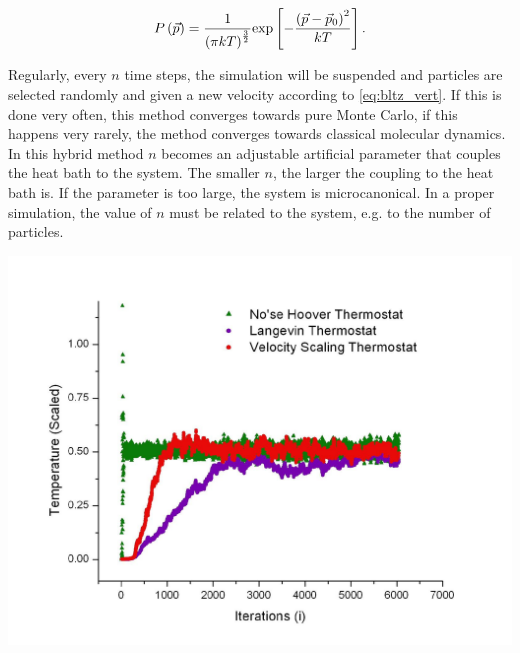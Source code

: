 \begin{equation}
P\left(\vec{p}\right) = \frac{1}{\left(\pi k T\right)^\frac{3}{2}} \text{exp}\left[ - \frac{\left(\vec{p}-\vec{p}_0\right)^2}{kT}  \right].
\label{eq:bltz_vert}
\end{equation}

Regularly, every $n$ time steps, the simulation will be suspended and particles are selected randomly and given a new velocity according to \eqref{eq:bltz_vert}. If this is done very often, this method converges towards pure Monte Carlo, if this happens very rarely, the method converges towards classical molecular dynamics. In this hybrid method $n$ becomes an adjustable artificial parameter  that couples the heat bath to the system. The smaller $n$, the larger the coupling to the heat bath is. If the parameter is too large, the system is microcanonical. In a proper simulation, the value of $n$ must be related to the system, e.g. to the number of particles.


\vspace{0.1cm}
\noindent
\begin{minipage}{\textwidth}
\begin{minipage}{.001\textwidth}
 \end{minipage}\hfill
\begin{minipage}{.99\textwidth}
  \centering
  \includegraphics[width=\textwidth]{pics/thermostats.jpg}
  \label{fig:thermostats_comp}
\end{minipage}
\end{minipage}
\vspace{0.1cm}




